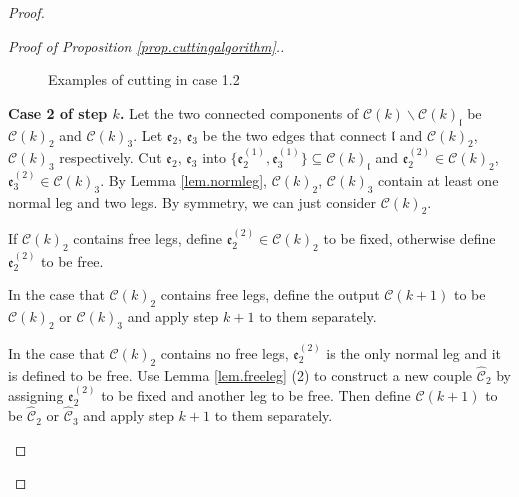 \begin{proof}
\begin{proof}[Proof of Proposition \ref{prop.cuttingalgorithm}.]
\begin{mdframed}
\begin{figure}[H]
{
    }
        \caption{Examples of cutting in case 1.2}
        \label{fig.step1case1.2}
    \end{figure}

\textbf{Case 2 of step $k$.} Let the two connected components of $\mathcal{C}(k)\backslash \mathcal{C}(k)_{\mathfrak{l}}$ be $\mathcal{C}(k)_2$ and $\mathcal{C}(k)_3$. Let $\mathfrak{e}_{2}$, $\mathfrak{e}_{3}$ be the two edges that connect $\mathfrak{l}$ and  $\mathcal{C}(k)_2$, $\mathcal{C}(k)_3$ respectively. Cut
$\mathfrak{e}_{2}$, $\mathfrak{e}_{3}$ into $\{\mathfrak{e}_{2}^{(1)},\mathfrak{e}_{3}^{(1)}\}\subseteq \mathcal{C}(k)_{\mathfrak{l}}$ and $\mathfrak{e}_{2}^{(2)}\in \mathcal{C}(k)_2$, $\mathfrak{e}_{3}^{(2)}\in \mathcal{C}(k)_3$. 
By Lemma \ref{lem.normleg}, $\mathcal{C}(k)_2$, $\mathcal{C}(k)_3$ contain at least one normal leg and two legs. By symmetry, we can just consider $\mathcal{C}(k)_2$. 

If $\mathcal{C}(k)_2$ contains free legs, define $\mathfrak{e}_{2}^{(2)}\in \mathcal{C}(k)_2$ to be fixed, otherwise define $\mathfrak{e}_{2}^{(2)}$ to be free. 

In the case that $\mathcal{C}(k)_2$ contains free legs, define the output $\mathcal{C}(k+1)$ to be $\mathcal{C}(k)_2$ or $\mathcal{C}(k)_3$ and apply step $k+1$ to them separately. 

In the case that $\mathcal{C}(k)_2$ contains no free legs, $\mathfrak{e}_{2}^{(2)}$ is the only normal leg and it is defined to be free. Use Lemma \ref{lem.freeleg} (2) to construct a new couple $\widehat{\mathcal{C}}_2$ by assigning $\mathfrak{e}_2^{(2)}$ to be fixed and another leg to be free. Then define $\mathcal{C}(k+1)$ to be $\widehat{\mathcal{C}}_2$ or $\widehat{\mathcal{C}}_3$ and apply step $k+1$ to them separately. 


\end{mdframed}
\end{proof}
\end{proof}
